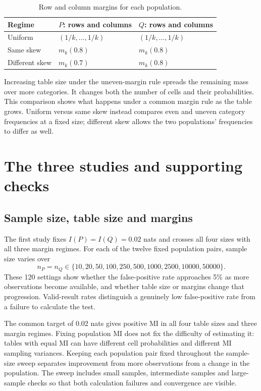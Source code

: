 \begin{table}[htbp]
\centering
\caption{Row and column margins for each population.}
\label{tab:margin-profiles}
\begin{tabular}{@{}lll@{}}
\toprule
Regime & \(P\): rows and columns & \(Q\): rows and columns\\
\midrule
Uniform & \((1/k,\ldots,1/k)\) & \((1/k,\ldots,1/k)\)\\
Same skew & \(m_k(0.8)\) & \(m_k(0.8)\)\\
Different skew & \(m_k(0.7)\) & \(m_k(0.8)\)\\
\bottomrule
\end{tabular}
\end{table}

Increasing table size under the uneven-margin rule spreads the remaining
mass over more categories. It changes both the number of cells and their
probabilities. This comparison shows what happens under a common margin
rule as the table grows. Uniform versus same skew instead compares even
and uneven category frequencies at a fixed size; different skew allows the
two populations' frequencies to differ as well.

\section{The three studies and supporting checks}

\subsection{Sample size, table size and margins}

The first study fixes \(I(P)=I(Q)=0.02\) nats and crosses all four sizes
with all three margin regimes. For each of the twelve fixed population
pairs, sample size varies over
\begin{equation}
 n_P=n_Q\in\{10,20,50,100,250,500,1000,2500,10000,50000\}.
 \label{eq:null-sample-grid}
\end{equation}
These 120 settings show whether the false-positive rate approaches 5\%
as more observations become available, and whether table size or margins
change that progression. Valid-result rates distinguish a genuinely low
false-positive rate from a failure to calculate the test.

The common target of 0.02 nats gives positive MI in all four table sizes
and three margin regimes. Fixing population MI does not fix the
difficulty of estimating it: tables with equal MI can have different
cell probabilities and different MI sampling variances. Keeping each
population pair fixed throughout the sample-size sweep separates
improvement from more observations from a change in the population.
The sweep includes small samples, intermediate samples and large-sample
checks so that both calculation failures and convergence are visible.

